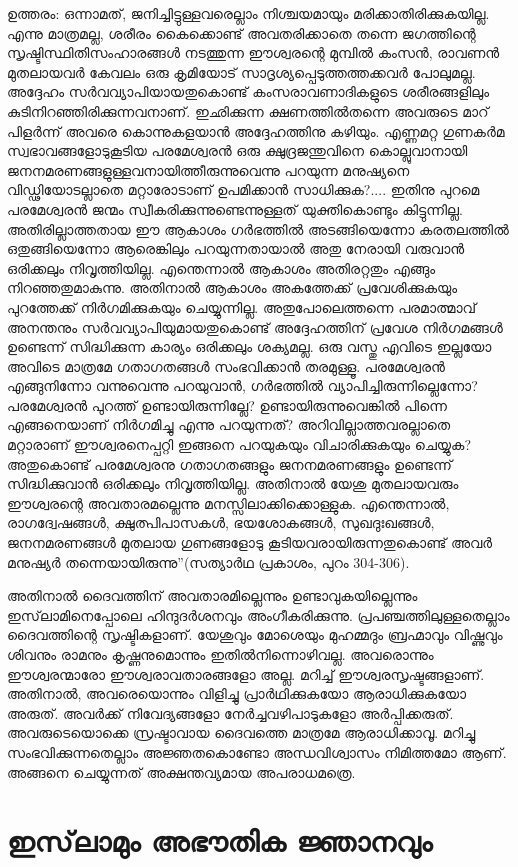 ഉത്തരം: ഒന്നാമത്, ജനിച്ചിട്ടുള്ളവരെല്ലാം നിശ്ചയമായും മരിക്കാതിരിക്കുകയില്ല. എന്നു മാത്രമല്ല, ശരീരം കൈക്കൊണ്ട് അവതരിക്കാതെ തന്നെ ജഗത്തിന്റെ സൃഷ്ടിസ്ഥിതിസംഹാരങ്ങള്‍ നടത്തുന്ന ഈശ്വരന്റെ മുമ്പില്‍ കംസന്‍, രാവണന്‍ മുതലായവര്‍ കേവലം ഒരു കൃമിയോട് സാദൃശ്യപ്പെടുത്തത്തക്കവര്‍ പോലുമല്ല. അദ്ദേഹം സര്‍വവ്യാപിയായതുകൊണ്ട് കംസരാവണാദികളുടെ ശരീരങ്ങളിലും കുടിനിറഞ്ഞിരിക്കുന്നവനാണ്. ഇഛിക്കുന്ന ക്ഷണത്തില്‍തന്നെ അവരുടെ മാറ് പിളര്‍ന്ന് അവരെ കൊന്നുകളയാന്‍ അദ്ദേഹത്തിനു കഴിയും. എണ്ണമറ്റ ഗുണകര്‍മ സ്വഭാവങ്ങളോടുകൂടിയ പരമേശ്വരന്‍ ഒരു ക്ഷുദ്രജന്തുവിനെ കൊല്ലുവാനായി ജനനമരണങ്ങളുള്ളവനായിത്തീരുന്നുവെന്നു പറയുന്ന മനുഷ്യനെ വിഡ്ഢിയോടല്ലാതെ മറ്റാരോടാണ് ഉപമിക്കാന്‍ സാധിക്കുക?.... ഇതിനു പുറമെ പരമേശ്വരന്‍ ജന്മം സ്വീകരിക്കുന്നുണ്ടെന്നുള്ളത് യുക്തികൊണ്ടും കിട്ടുന്നില്ല. അതിരില്ലാത്തതായ ഈ ആകാശം ഗര്‍ഭത്തില്‍ അടങ്ങിയെന്നോ കരതലത്തില്‍ ഒതുങ്ങിയെന്നോ ആരെങ്കിലും പറയുന്നതായാല്‍ അതു നേരായി വരുവാന്‍ ഒരിക്കലും നിവൃത്തിയില്ല. എന്തെന്നാല്‍ ആകാശം അതിരറ്റതും എങ്ങും നിറഞ്ഞതുമാകുന്നു. അതിനാല്‍ ആകാശം അകത്തേക്ക് പ്രവേശിക്കുകയും പുറത്തേക്ക് നിര്‍ഗമിക്കുകയും ചെയ്യുന്നില്ല. അതുപോലെത്തന്നെ പരമാത്മാവ് അനന്തനും സര്‍വവ്യാപിയുമായതുകൊണ്ട് അദ്ദേഹത്തിന് പ്രവേശ നിര്‍ഗമങ്ങള്‍ ഉണ്ടെന്ന് സിദ്ധിക്കുന്ന കാര്യം ഒരിക്കലും ശക്യമല്ല. ഒരു വസ്തു എവിടെ ഇല്ലയോ അവിടെ മാത്രമേ ഗതാഗതങ്ങള്‍ സംഭവിക്കാന്‍ തരമുള്ളൂ. പരമേശ്വരന്‍ എങ്ങുനിന്നോ വന്നുവെന്നു പറയുവാന്‍, ഗര്‍ഭത്തില്‍ വ്യാപിച്ചിരുന്നില്ലെന്നോ? പരമേശ്വരന്‍ പുറത്ത് ഉണ്ടായിരുന്നില്ലേ? ഉണ്ടായിരുന്നുവെങ്കില്‍ പിന്നെ എങ്ങനെയാണ് നിര്‍ഗമിച്ചു എന്നു പറയുന്നത്? അറിവില്ലാത്തവരല്ലാതെ മറ്റാരാണ് ഈശ്വരനെപ്പറ്റി ഇങ്ങനെ പറയുകയും വിചാരിക്കുകയും ചെയ്യുക? അതുകൊണ്ട് പരമേശ്വരനു ഗതാഗതങ്ങളും ജനനമരണങ്ങളും ഉണ്ടെന്ന് സിദ്ധിക്കുവാന്‍ ഒരിക്കലും നിവൃത്തിയില്ല. അതിനാല്‍ യേശു മുതലായവരും ഈശ്വരന്റെ അവതാരമല്ലെന്നു മനസ്സിലാക്കിക്കൊള്ളുക. എന്തെന്നാല്‍, രാഗദ്വേഷങ്ങള്‍, ക്ഷുത്പിപാസകള്‍, ഭയശോകങ്ങള്‍, സുഖദുഃഖങ്ങള്‍, ജനനമരണങ്ങള്‍ മുതലായ ഗുണങ്ങളോടു കൂടിയവരായിരുന്നതുകൊണ്ട് അവര്‍ മനുഷ്യര്‍ തന്നെയായിരുന്നു''(സത്യാര്‍ഥ പ്രകാശം, പുറം 304-306).

അതിനാല്‍ ദൈവത്തിന് അവതാരമില്ലെന്നും ഉണ്ടാവുകയില്ലെന്നും ഇസ്‌ലാമിനെപ്പോലെ ഹിന്ദുദര്‍ശനവും അംഗീകരിക്കുന്നു. പ്രപഞ്ചത്തിലുള്ളതെല്ലാം ദൈവത്തിന്റെ സൃഷ്ടികളാണ്. യേശുവും മോശെയും മുഹമ്മദും ബ്രഹ്മാവും വിഷ്ണുവും ശിവനും രാമനും കൃഷ്ണനുമൊന്നും ഇതില്‍നിന്നൊഴിവല്ല. അവരൊന്നും ഈശ്വരന്മാരോ ഈശ്വരാവതാരങ്ങളോ അല്ല. മറിച്ച് ഈശ്വരസൃഷ്ടങ്ങളാണ്. അതിനാല്‍, അവരെയൊന്നും വിളിച്ചു പ്രാര്‍ഥിക്കുകയോ ആരാധിക്കുകയോ അരുത്. അവര്‍ക്ക് നിവേദ്യങ്ങളോ നേര്‍ച്ചവഴിപാടുകളോ അര്‍പ്പിക്കരുത്. അവരുടെയൊക്കെ സ്രഷ്ടാവായ ദൈവത്തെ മാത്രമേ ആരാധിക്കാവൂ. മറിച്ചു സംഭവിക്കുന്നതെല്ലാം അജ്ഞതകൊണ്ടോ അന്ധവിശ്വാസം നിമിത്തമോ ആണ്. അങ്ങനെ ചെയ്യുന്നത് അക്ഷന്തവ്യമായ അപരാധമത്രെ.
\chapter{ഇസ്‌ലാമും അഭൗതിക ജ്ഞാനവും }
